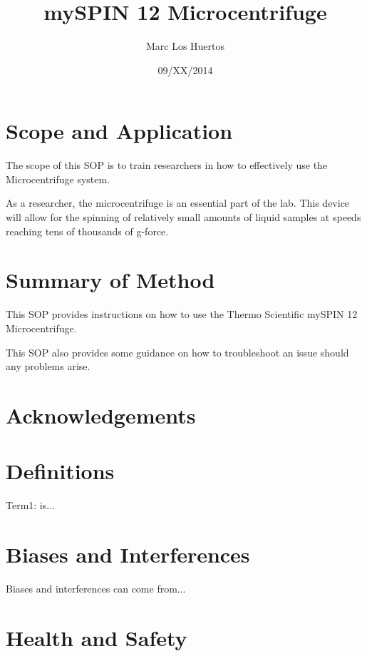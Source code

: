 \documentclass[12pt]{../SOP3_beta}
\title{mySPIN 12 Microcentrifuge}
\date{09/XX/2014}
\author{Marc Los Huertos}
\begin{document}


\maketitle

\section{Scope and Application}

\NP The scope of this SOP is to train researchers in how to effectively use the Microcentrifuge system.

\NP As a researcher, the microcentrifuge is an essential part of the lab. This device will allow for the spinning of relatively small amounts of liquid samples at speeds reaching tens of thousands of g-force. 

\section{Summary of Method}

\NP This SOP provides instructions on how to use the Thermo Scientific mySPIN 12 Microcentrifuge. 

\NP This SOP also provides some guidance on how to troubleshoot an issue should any problems arise. 

\tableofcontents

\newpage

\section{Acknowledgements}

\section{Definitions}

\NP Term1: is...

\section{Biases and Interferences}

\NP Biases and interferences can come from...

\section{Health and Safety}
\end{document}
